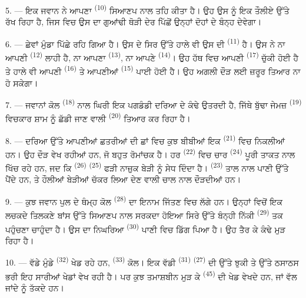 5. --- ਇਕ ਜਵਾਨ ਨੇ ਆਪਣਾ  \textsuperscript{(10)} ਸਿਆਣਪ ਨਾਲ ਤਹਿ ਕੀਤਾ ਹੈ।
ਉਹ ਉਸ ਨੂੰ ਇਕ ਤੌਲੀਏ ਉੱਤੇ ਰੱਖ ਰਿਹਾ ਹੈ, ਜਿਸ ਵਿਚ ਉਸ ਦਾ ਗੁਆਂਢੀ ਥੋੜੀ ਦੇਰ ਪਿੱਛੋਂ
ਉਨ੍ਹਾਂ ਦੋਹਾਂ ਦੇ  ਬੰਨ੍ਹ ਦੇਵੇਗਾ।

6. --- ਛੇਵਾਂ ਮੁੰਡਾ ਪਿੱਛੇ ਰਹਿ ਗਿਆ ਹੈ। ਉਸ ਦੇ ਸਿਰ ਉੱਤੇ ਹਾਲੇ ਵੀ ਉਸ ਦੀ
 \textsuperscript{(11)} ਹੈ। ਉਸ ਨੇ ਨਾ ਆਪਣੀ 
\textsuperscript{(12)} ਲਾਹੀ ਹੈ, ਨਾ ਆਪਣਾ  \textsuperscript{(13)}, ਨਾ
ਆਪਣੇ  \textsuperscript{(14)}। ਉਹ ਹੱਥ ਵਿਚ ਆਪਣੀ 
\textsuperscript{(17)} ਚੁੱਕੀ ਹੋਈ ਹੈ ਤੇ ਹਾਲੇ ਵੀ ਆਪਣੀ 
\textsuperscript{(16)} ਤੇ ਆਪਣੀਆਂ  \textsuperscript{(15)} ਪਾਈ ਹੋਈ ਹੈ।
ਉਹ ਅਗਲੀ ਦੌੜ ਲਈ ਜ਼ਰੂਰ ਤਿਆਰ ਨਾ ਹੋ ਸਕੇਗਾ।

7. --- ਜਵਾਨਾਂ ਕੋਲ  \textsuperscript{(18)} ਨਾਲ ਘਿਰੀ ਇਕ ਪਗਡੰਡੀ
ਦਰਿਆ ਦੇ ਕੰਢੇ ਉਤਰਦੀ ਹੈ, ਜਿੱਥੇ ਬੁੱਢਾ ਜੇਮਜ਼  \textsuperscript{(19)}
ਵਿਚਕਾਰ ਸ਼ਾਮ ਨੂੰ ਛੱਡੀ ਜਾਣ ਵਾਲੀ  \textsuperscript{(20)} ਤਿਆਰ ਕਰ
ਰਿਹਾ ਹੈ।

\VUsaut{4.4mm}
\VUsaut{3.4mm}

8. --- ਦਰਿਆ ਉੱਤੇ ਆਪਣੀਆਂ ਛਤਰੀਆਂ ਦੀ ਛਾਂ ਵਿਚ ਕੁਝ ਬੀਬੀਆਂ ਇਕ 
\textsuperscript{(21)} ਵਿਚ ਨਿਕਲੀਆਂ ਹਨ। ਉਹ ਦੌੜ ਵੇਖ ਰਹੀਆਂ ਹਨ, ਜੋ ਬਹੁਤ ਰੋਮਾਂਚਕ ਹੈ।
ਹਰ  \textsuperscript{(22)} ਵਿਚ ਚਾਰ 
\textsuperscript{(24)} ਪੂਰੀ ਤਾਕਤ ਨਾਲ ਖਿੱਚ ਰਹੇ ਹਨ, ਜਦ ਕਿ 
\textsuperscript{(26)}  \textsuperscript{(25)} ਫੜੀ ਨਾਜ਼ੁਕ ਬੇੜੀ ਨੂੰ
ਸੇਧ ਦਿੰਦਾ ਹੈ।  \textsuperscript{(23)} ਤਾਲ ਨਾਲ ਪਾਣੀ ਉੱਤੇ ਪੈਂਦੇ ਹਨ, ਤੇ
ਹੌਲੀਆਂ ਬੇੜੀਆਂ ਚੱਕਰ ਲਿਆ ਦੇਣ ਵਾਲੀ ਚਾਲ ਨਾਲ ਦੌੜਦੀਆਂ ਹਨ।

9. --- ਕੁਝ ਜਵਾਨ ਪੁਲ ਦੇ ਥੰਮ੍ਹ ਕੋਲ  \textsuperscript{(28)} ਦਾ
ਇਨਾਮ ਜਿੱਤਣ ਵਿਚ ਲੱਗੇ ਹਨ। ਉਨ੍ਹਾਂ ਵਿਚੋਂ ਇਕ ਲਚਕਦੇ ਤਿਲਕਣੇ ਬਾਂਸ ਉੱਤੇ ਸਿਆਣਪ ਨਾਲ
ਸਰਕਦਾ ਹੋਇਆ ਸਿਰੇ ਉੱਤੇ ਬੰਨ੍ਹੀ ਨਿੱਕੀ  \textsuperscript{(29)} ਤਕ ਪਹੁੰਚਣਾ
ਚਾਹੁੰਦਾ ਹੈ। ਉਸ ਦਾ ਨਿਘਰਿਆ  \textsuperscript{(30)} ਪਾਣੀ ਵਿਚ ਡਿੱਗ
ਪਿਆ ਹੈ। ਉਹ ਤੈਰ ਕੇ ਕੰਢੇ ਮੁੜ ਰਿਹਾ ਹੈ।

10. --- ਵੱਡੇ ਮੁੰਡੇ  \textsuperscript{(32)} ਖੇਡ ਰਹੇ ਹਨ,
 \textsuperscript{(33)} ਕੋਲ। ਇਕ ਵੱਡੀ  \textsuperscript{(31)}
 \textsuperscript{(27)} ਦੀ  ਉੱਤੇ ਝੁਕੀ ਤੇ
 ਉੱਤੇ ਠਸਾਠਸ ਭਰੀ ਇਹ ਸਾਰੀਆਂ ਖੇਡਾਂ ਵੇਖ ਰਹੀ ਹੈ। ਪਰ ਕੁਝ ਤਮਾਸ਼ਬੀਨ ਮੁੜ ਕੇ
 \textsuperscript{(45)} ਦੀ ਖੇਡ ਵੇਖਦੇ ਹਨ, ਜਾਂ
 ਵੱਲ ਜਾਂਦੇ  ਨੂੰ ਤੱਕਦੇ ਹਨ।

